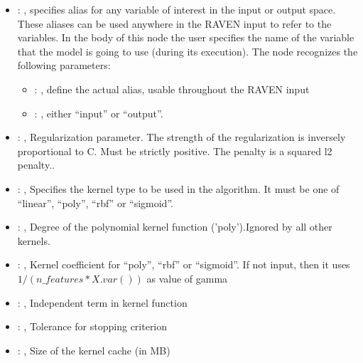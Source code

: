 \begin{itemize}
    \item {}: , 
      specifies alias for         any variable of interest in the input or output space. These
      aliases can be used anywhere in the RAVEN input to         refer to the variables. In the body
      of this node the user specifies the name of the variable that the model is going to use
      (during its execution).
      The  node recognizes the following parameters:
        \begin{itemize}
          \item {}: , 
            define the actual alias, usable throughout the RAVEN input
          \item {}: , 
            either ``input'' or ``output''.
      \end{itemize}

    \item {}: , 
      Regularization parameter. The strength of the regularization is inversely
      proportional to C.                                                            Must be strictly
      positive. The penalty is a squared l2 penalty..

    \item {}: , 
      Specifies the kernel type to be used in the algorithm. It must be one of
      ``linear'', ``poly'', ``rbf'' or ``sigmoid''.

    \item {}: , 
      Degree of the polynomial kernel function ('poly').Ignored by all other kernels.

    \item {}: , 
      Kernel coefficient for ``poly'', ``rbf'' or ``sigmoid''. If not input, then it uses
      $1 / (n\_features * X.var())$ as value of gamma

    \item {}: , 
      Independent term in kernel function

    \item {}: , 
      Tolerance for stopping criterion

    \item {}: , 
      Size of the kernel cache (in MB)


\end{itemize}
